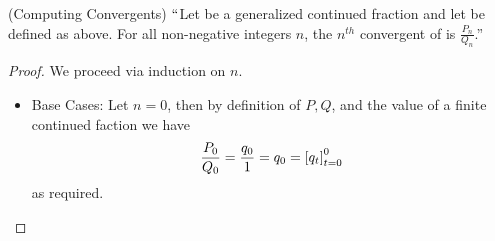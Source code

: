         \begin{theorem}(Computing Convergents)
            $``$Let  be a generalized continued fraction and let 
            be defined as above. For all non-negative integers $n$, the $n^{th}$ convergent
            of  is $\frac{P_n}{Q_n}$.''
        \end{theorem}
        \begin{proof}
            We proceed via induction on $n$.
            \begin{itemize}
                \item
                    Base Cases: Let $n = 0$, then by definition of $P, Q$, and the value of
                    a finite continued faction we have
                    \[
                        \frac{P_0}{Q_0} = \frac{q_0}{1} = q_0 = \left[ q_t \right]_{t = 0}^{0}
                    \]
                    as required.


\end{itemize}
\end{proof}
